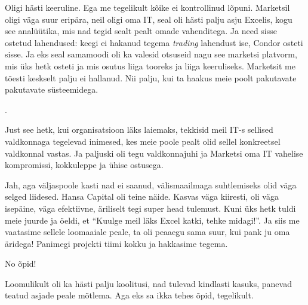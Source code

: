 
Oligi hästi keeruline. Ega me tegelikult kõike ei kontrollinud lõpuni. 
Marketsil oligi  väga suur eripära, neil oligi oma IT, 
seal oli hästi palju asju Excelis, kogu see analüütika, mis nad tegid sealt 
pealt omade vahenditega. Ja need sisse ostetud lahendused: keegi ei hakanud 
tegema \emph{trading} lahendust ise, Condor osteti sisse. Ja eks seal samamoodi 
oli ka valesid otsuseid nagu see marketsi platvorm, mis üks hetk osteti ja mis 
osutus liiga tooreks ja liiga keeruliseks. Marketsit me tõesti keskselt palju 
ei hallanud. Nii palju, kui ta haakus meie poolt pakutavate  pakutavate 
süsteemidega. 

. 

Just see hetk, kui organisatsioon läks  laiemaks, tekkisid meil IT-s sellised 
valdkonnaga tegelevad inimesed, kes meie poole pealt olid sellel konkreetsel 
valdkonnal vastas. Ja paljuski oli tegu valdkonnajuhi ja Marketsi oma IT 
vahelise kompromissi, kokkuleppe ja ühise ostusega. 


Jah, aga väljaspoole kasti nad ei saanud, välismaailmaga suhtlemiseks olid väga 
selged liidesed. Hansa Capital oli teine näide. 
Kasvas  väga kiiresti, oli väga isepäine, väga efektiivne, äriliselt tegi super 
head tulemust. Kuni üks hetk tuldi meie juurde ja öeldi, et \enquote{Kuulge 
meil läks Excel katki, tehke midagi!}. Ja siis me vaatasime sellele loomaaiale 
peale, ta oli peaaegu sama suur, kui pank ju oma äridega! Panimegi projekti 
tiimi kokku ja hakkasime tegema. 


No õpid! 

Loomulikult oli ka hästi palju koolitusi, nad tulevad kindlasti kasuks, panevad 
teatud asjade peale mõtlema. Aga eks sa ikka tehes õpid, tegelikult. 

